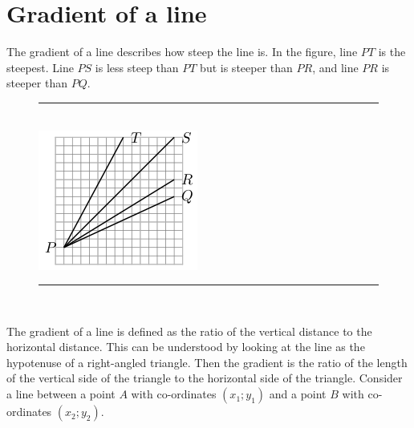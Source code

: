             \section{ Gradient of a line}
            \nopagebreak
\label{m39108*id67971}The gradient of a line describes how steep the line is. In the figure, line $PT$ is the steepest. Line $PS$ is less steep than $PT$ but is steeper than $PR$, and line $PR$ is steeper than $PQ$.\par 
    \setcounter{subfigure}{0}
	\begin{figure}[H] %
    \begin{center}
    \rule[.1in]{\figurerulewidth}{.005in} \\
        \label{m39108*uid41!!!underscore!!!media}\label{m39108*uid41!!!underscore!!!printimage}\includegraphics{col11306.imgs/m39108_MG10C14_017.png} %
      \vspace{2pt}
    \vspace{.1in}
    \rule[.1in]{\figurerulewidth}{.005in} \\
    \end{center}
 \end{figure}       
        \label{m39108*id68057}The gradient of a line is defined as the ratio of the vertical distance to the horizontal distance. This can be understood by looking at the line as the hypotenuse of a right-angled triangle. Then the gradient is the ratio of the length of the vertical side of the triangle to the horizontal side of the triangle. Consider a line between a point $A$ with co-ordinates $\left({x}_{1};{y}_{1}\right)$ and a point $B$ with co-ordinates $\left({x}_{2};{y}_{2}\right)$.\par 
    \setcounter{subfigure}{0}
